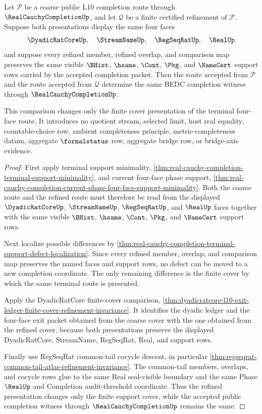 \begin{theorem}
\label{thm:real-cauchy-completion-terminal-support-refinement-invariance}
Let $\mathcal P$ be a coarse public L10 completion route through $\RealCauchyCompletionUp$, and let $\mathcal Q$ be a finite certified refinement of $\mathcal P$. Suppose both presentations display the same four faces
$$
\DyadicRatCoreUp,\quad \StreamNameUp,\quad \RegSeqRatUp,\quad \RealUp
$$
and suppose every refined member, refined overlap, and comparison map preserves the same visible $\BHist$, $\hsame$, $\Cont$, $\Pkg$, and $\NameCert$ support rows carried by the accepted completion packet. Then the route accepted from $\mathcal P$ and the route accepted from $\mathcal Q$ determine the same BEDC completion witness through $\RealCauchyCompletionUp$.

This comparison changes only the finite cover presentation of the terminal four-face route. It introduces no quotient stream, selected limit, host real equality, countable-choice row, ambient completeness principle, metric-completeness datum, aggregate $\formalstatus$ row, aggregate bridge row, or bridge-axis evidence.
\end{theorem}
\begin{proof}
First apply terminal support minimality, \autoref{thm:real-cauchy-completion-terminal-support-minimality}, and current four-face phase support, \autoref{thm:real-cauchy-completion-current-phase-four-face-support-minimality}. Both the coarse route and the refined route must therefore be read from the displayed $\DyadicRatCoreUp$, $\StreamNameUp$, $\RegSeqRatUp$, and $\RealUp$ faces together with the same visible $\BHist$, $\hsame$, $\Cont$, $\Pkg$, and $\NameCert$ support rows.

Next localize possible differences by \autoref{thm:real-cauchy-completion-terminal-support-defect-localization}. Since every refined member, overlap, and comparison map preserves the named faces and support rows, no defect can be moved to a new completion coordinate. The only remaining difference is the finite cover by which the same terminal route is presented.

Apply the DyadicRatCore finite-cover comparison, \autoref{thm:dyadicratcore-l10-exit-ledger-finite-cover-refinement-invariance}. It identifies the dyadic ledger and the four-face exit packet obtained from the coarse cover with the one obtained from the refined cover, because both presentations preserve the displayed DyadicRatCore, StreamName, RegSeqRat, Real, and support rows.

Finally use RegSeqRat common-tail cocycle descent, in particular \autoref{thm:regseqrat-common-tail-atlas-refinement-invariance}. The common-tail members, overlaps, and cocycle rows glue to the same Real seal-visible boundary and the same Phase $\RealUp$ and Completion audit-threshold coordinate. Thus the refined presentation changes only the finite support cover, while the accepted public completion witness through $\RealCauchyCompletionUp$ remains the same.
\end{proof}

